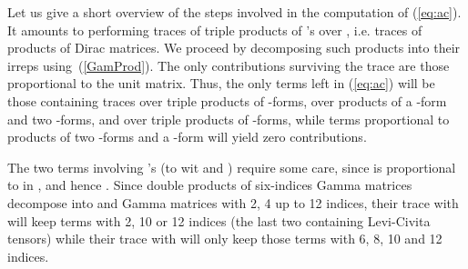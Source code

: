 \documentclass[a4paper,11pt]{article}
\def\Id{{\rm 1\kern-.28em I}}
\begin{document}
Let us give a short overview of the steps involved in the computation of (\ref{eq:ac}). 
It amounts to performing traces of triple products of  \coordHE{}'s over \coordHE{}, i.e.
traces of products of Dirac matrices. We proceed by decomposing such products into their irreps using~(\ref{GamProd}).
The only contributions surviving the trace are those proportional to the unit matrix. 
Thus, the only terms left in (\ref{eq:ac}) will be those containing traces over triple products of \coordHE{}-forms, 
over products of a \coordHE{}-form and two \coordHE{}-forms, and over  triple products of \coordHE{}-forms, while
terms proportional to products of two \coordHE{}-forms and a \coordHE{}-form will yield zero contributions.

The two terms involving \coordHE{}'s (to wit \coordHE{} and \coordHE{}) require some care, since 
\coordHE{} is proportional to \myHighlight{$\Gamma_{\star}$}\coordHE{} in \coordHE{}, and hence 
\coordHE{}. 
Since double products of six-indices Gamma matrices decompose into \myHighlight{$\Id$}\coordHE{} and Gamma matrices with
2, 4 up to 12 indices, their trace with \coordHE{} will keep terms with 2, 10
or 12 indices (the last two containing Levi-Civita tensors) while their trace with \coordHE{}   
will only keep those terms with 6, 8, 10 and 12 indices.
\end{document}
